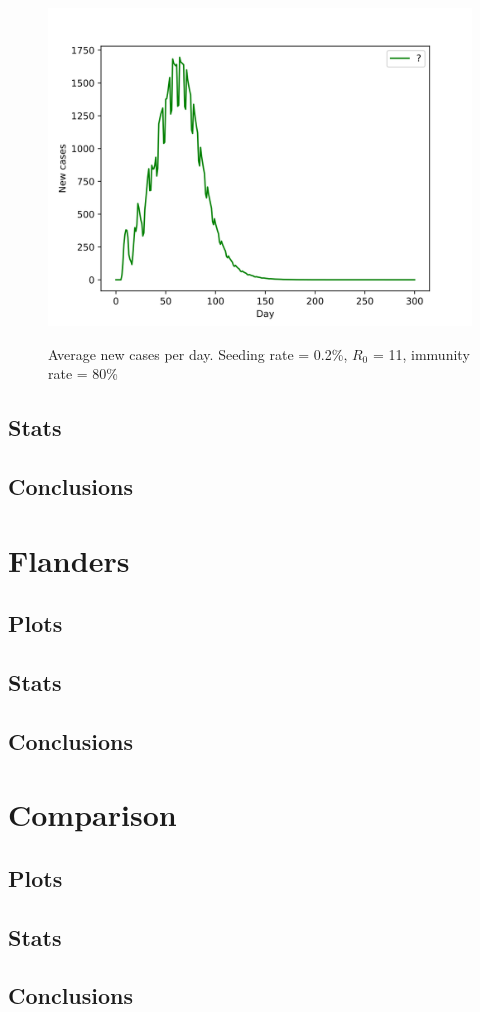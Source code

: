 \documentclass{article}
\begin{document}
\begin{figure}
	\centering
	\includegraphics[width=\linewidth]{./Belgie/AVG_SR=0.002.svg}
	\label{Belgie-AVG_SR02}
	\caption{Average new cases per day. Seeding rate = 0.2\%, $R_0$ = 11, immunity rate = 80\%}
\end{figure}

\subsection{Stats}

\subsection{Conclusions}


\section{Flanders}
\subsection{Plots}

\subsection{Stats}

\subsection{Conclusions}

\section{Comparison}
\subsection{Plots}

\subsection{Stats}

\subsection{Conclusions}
\end{document}
